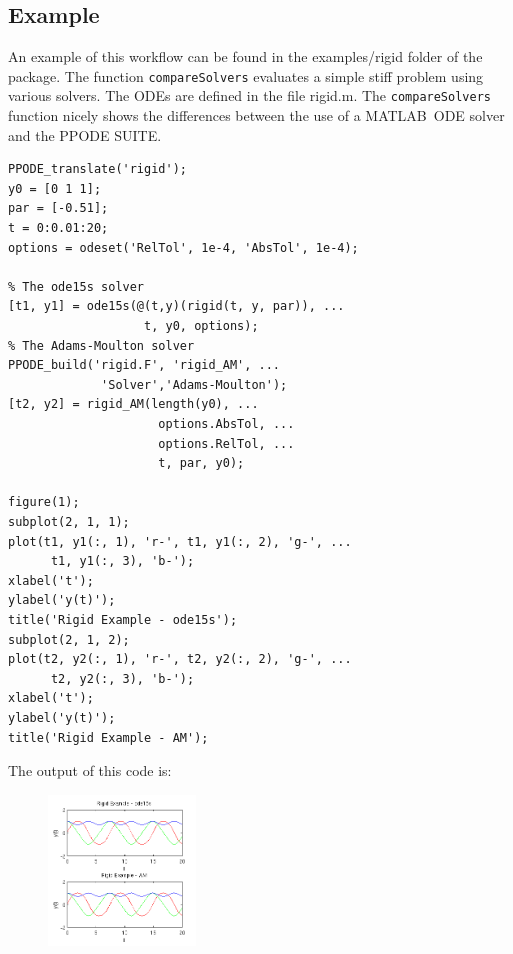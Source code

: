 \documentclass[a4paper,10pt,twocolumn]{article}
\newcommand{\PPODESUITE}{PPODE SUITE}
\newcommand{\MATLAB}{MATLAB}
\newcommand{\matlabcmdinline}[1]{\textacutedbl\texttt{\footnotesize#1}\textgravedbl}
\newcommand{\filepath}[1]{{\footnotesize\textacutedbl #1\textacutedbl}}
\begin{document}
\subsection*{Example}
An example of this workflow can be found in the \filepath{examples/rigid} folder of the package. The function \matlabcmdinline{compareSolvers} evaluates a simple stiff problem using various solvers. The ODEs are defined in the file \filepath{rigid.m}. The \matlabcmdinline{compareSolvers} function nicely shows the differences between the use of a \MATLAB~ODE solver and the \PPODESUITE.
\vspace{1cm}
  \begin{lstlisting}[style=matlabcode,caption=Code Snippet]
PPODE_translate('rigid');
y0 = [0 1 1];
par = [-0.51];
t = 0:0.01:20;
options = odeset('RelTol', 1e-4, 'AbsTol', 1e-4);

% The ode15s solver
[t1, y1] = ode15s(@(t,y)(rigid(t, y, par)), ...
                   t, y0, options);
% The Adams-Moulton solver
PPODE_build('rigid.F', 'rigid_AM', ...
             'Solver','Adams-Moulton');
[t2, y2] = rigid_AM(length(y0), ...
                     options.AbsTol, ... 
                     options.RelTol, ...
                     t, par, y0);
                     
figure(1);
subplot(2, 1, 1);
plot(t1, y1(:, 1), 'r-', t1, y1(:, 2), 'g-', ...
      t1, y1(:, 3), 'b-');
xlabel('t');
ylabel('y(t)');
title('Rigid Example - ode15s');
subplot(2, 1, 2);
plot(t2, y2(:, 1), 'r-', t2, y2(:, 2), 'g-', ...
      t2, y2(:, 3), 'b-');
xlabel('t');
ylabel('y(t)');
title('Rigid Example - AM');
\end{lstlisting}
The output of this code is:
\begin{figure}[hb!]
 \centering
 \includegraphics[width=0.35\textwidth]{./RigidSolution.png}
\end{figure}
\end{document}
